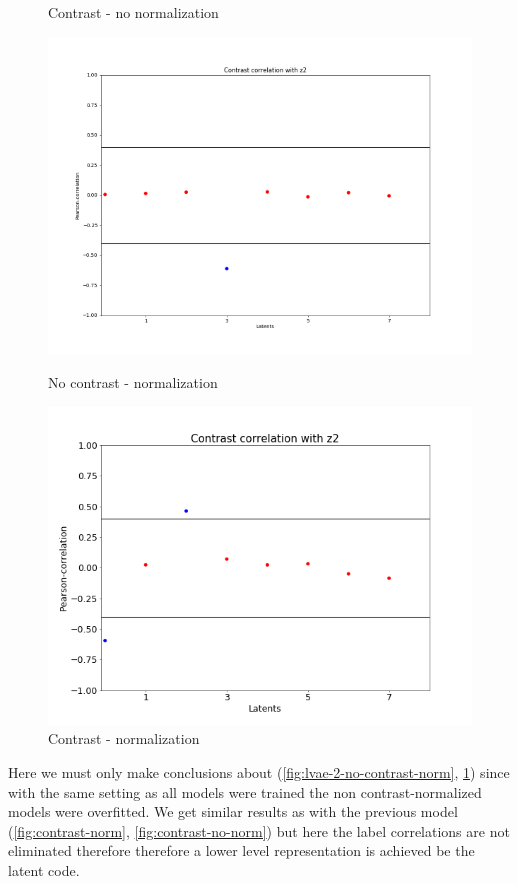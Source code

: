 \documentclass[12pt, english]{article}
\begin{document}
\begin{figure}[H]
\begin{minipage}{0.5\linewidth}
    \caption{Contrast - no normalization} 
    \label{fig:lvae-2-contrast-no-norm}
  \end{minipage} 
  \begin{minipage}{0.5\linewidth}
    \centering
    \includegraphics[width=.72\linewidth]{lvae2/18_DenseLadderVAE_contrastNorm-contrast-to-z2-corr.png} 
    \caption{No contrast - normalization} 
    \label{fig:lvae-2-no-contrast-norm}
  \end{minipage}%
  \begin{minipage}{0.5\linewidth}
    \centering
    \includegraphics[width=.72\linewidth]{lvae2/19_DenseLadderVAE_contrastNorm_contrast-contrast-to-z2-corr.png} 
    \caption{Contrast - normalization} 
    \label{fig:lave-2-contrast-norm}
  \end{minipage} 
\end{figure}

\vspace{4mm}

\par Here we must only make conclusions about (\ref{fig:lvae-2-no-contrast-norm}, \ref{fig:lave-2-contrast-norm}) since with the same setting as all models were trained the non contrast-normalized models were overfitted. We get similar results as with the previous model (\ref{fig:contrast-norm}, \ref{fig:contrast-no-norm}) but here the label correlations are not eliminated therefore therefore a lower level representation is achieved be the latent code.
\end{document}

